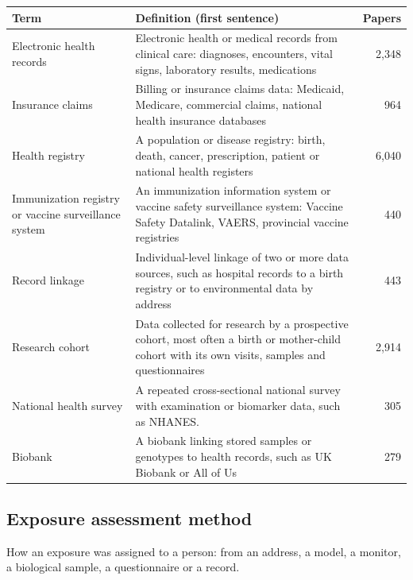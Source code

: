 \documentclass[10pt]{article}
\begin{document}
\begin{longtable}{@{}P{3.6cm}P{9.4cm}r@{}}\toprule Term & Definition (first sentence) & Papers\\\midrule\endhead
Electronic health records & Electronic health or medical records from clinical care: diagnoses, encounters, vital signs, laboratory results, medications & 2,348\\
Insurance claims & Billing or insurance claims data: Medicaid, Medicare, commercial claims, national health insurance databases & 964\\
Health registry & A population or disease registry: birth, death, cancer, prescription, patient or national health registers & 6,040\\
Immunization registry or vaccine surveillance system & An immunization information system or vaccine safety surveillance system: Vaccine Safety Datalink, VAERS, provincial vaccine registries & 440\\
Record linkage & Individual-level linkage of two or more data sources, such as hospital records to a birth registry or to environmental data by address & 443\\
Research cohort & Data collected for research by a prospective cohort, most often a birth or mother-child cohort with its own visits, samples and questionnaires & 2,914\\
National health survey & A repeated cross-sectional national survey with examination or biomarker data, such as NHANES. & 305\\
Biobank & A biobank linking stored samples or genotypes to health records, such as UK Biobank or All of Us & 279\\
\bottomrule\end{longtable}
\subsection{Exposure assessment method}
How an exposure was assigned to a person: from an address, a model, a monitor, a biological sample, a questionnaire or a record.
\end{document}
